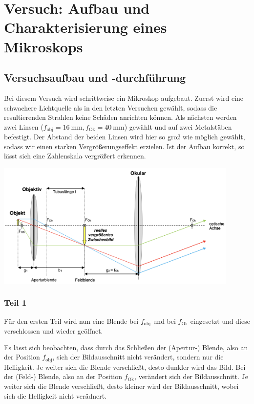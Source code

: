 \newpage

\section{Versuch: Aufbau und Charakterisierung eines Mikroskops}

    \subsection{Versuchsaufbau und -durchführung}

        Bei diesem Versuch wird schrittweise ein Mikroskop aufgebaut. Zuerst wird eine schwachere Lichtquelle als in den letzten Versuchen gewählt, sodass die resultierenden Strahlen keine Schäden anrichten können. Als nächsten werden zwei Linsen ($f_{\mathrm{obj}} = 16\ \mathrm{mm}, f_{\mathrm{Ok}} = 40\ \mathrm{mm}$) gewählt und auf zwei Metalstäben befestigt. Der Abstand der beiden Linsen wird hier so groß wie möglich gewählt, sodass wir einen starken Vergrößerungseffekt erzielen. Ist der Aufbau korrekt, so lässt sich eine Zahlenskala vergrößert erkennen.

        \begin{center}
            \includegraphics[width=0.9\textwidth]{bilder/skizze.png}
        \end{center}

        \subsubsection{Teil 1}
        
            Für den ersten Teil wird nun eine Blende bei $f_{\mathrm{obj}}$ und bei $f_{\mathrm{Ok}}$ eingesetzt und diese verschlossen und wieder geöffnet.

            Es lässt sich beobachten, dass durch das Schließen der (Apertur-) Blende, also an der Position $f_{\mathrm{obj}}$, sich der Bildausschnitt nicht verändert, sondern nur die Helligkeit. Je weiter sich die Blende verschließt, desto dunkler wird das Bild. Bei der (Feld-) Blende, also an der Position $f_{\mathrm{Ok}}$, verändert sich der Bildausschnitt. Je weiter sich die Blende verschließt, desto kleiner wird der Bildausschnitt, wobei sich die Helligkeit nicht verädnert.


